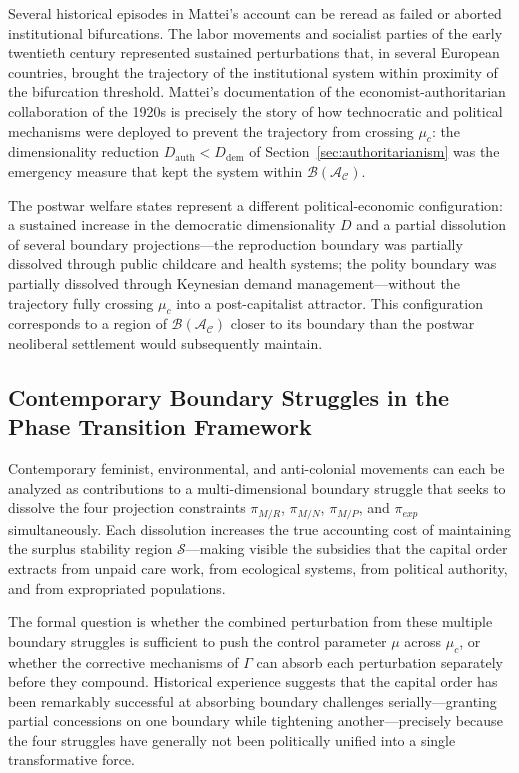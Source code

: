 \documentclass[12pt,a4paper]{article}
\theoremstyle{definition}
\theoremstyle{remark}
\begin{document}
Several historical episodes in Mattei's account can be reread as failed or aborted institutional bifurcations. The labor movements and socialist parties of the early twentieth century represented sustained perturbations that, in several European countries, brought the trajectory of the institutional system within proximity of the bifurcation threshold. Mattei's documentation of the economist-authoritarian collaboration of the 1920s is precisely the story of how technocratic and political mechanisms were deployed to prevent the trajectory from crossing $\mu_c$: the dimensionality reduction $D_{\text{auth}} < D_{\text{dem}}$ of Section~\ref{sec:authoritarianism} was the emergency measure that kept the system within $\mathcal{B}(\mathcal{A}_\mathcal{C})$.

The postwar welfare states represent a different political-economic configuration: a sustained increase in the democratic dimensionality $D$ and a partial dissolution of several boundary projections---the reproduction boundary was partially dissolved through public childcare and health systems; the polity boundary was partially dissolved through Keynesian demand management---without the trajectory fully crossing $\mu_c$ into a post-capitalist attractor. This configuration corresponds to a region of $\mathcal{B}(\mathcal{A}_\mathcal{C})$ closer to its boundary than the postwar neoliberal settlement would subsequently maintain.

\subsection{Contemporary Boundary Struggles in the Phase Transition Framework}

Contemporary feminist, environmental, and anti-colonial movements can each be analyzed as contributions to a multi-dimensional boundary struggle that seeks to dissolve the four projection constraints $\pi_{M/R}$, $\pi_{M/N}$, $\pi_{M/P}$, and $\pi_{exp}$ simultaneously. Each dissolution increases the true accounting cost of maintaining the surplus stability region $\mathcal{S}$---making visible the subsidies that the capital order extracts from unpaid care work, from ecological systems, from political authority, and from expropriated populations.

The formal question is whether the combined perturbation from these multiple boundary struggles is sufficient to push the control parameter $\mu$ across $\mu_c$, or whether the corrective mechanisms of $\Gamma$ can absorb each perturbation separately before they compound. Historical experience suggests that the capital order has been remarkably successful at absorbing boundary challenges serially---granting partial concessions on one boundary while tightening another---precisely because the four struggles have generally not been politically unified into a single transformative force.
\end{document}
